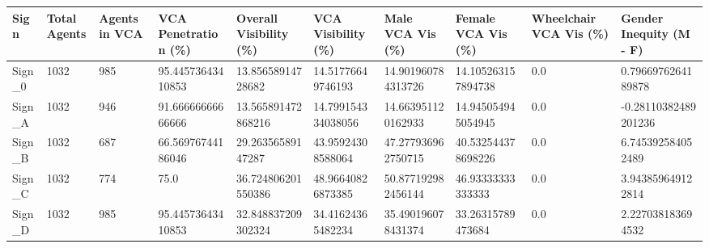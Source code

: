 \begin{tabular}{llllllllll}
\hline
Sign & Total Agents & Agents in VCA & VCA Penetration (\%) & Overall Visibility (\%) & VCA Visibility (\%) & Male VCA Vis (\%) & Female VCA Vis (\%) & Wheelchair VCA Vis (\%) & Gender Inequity (M - F) \\ \hline
Sign\_0 & 1032 & 985 & 95.44573643410853 & 13.85658914728682 & 14.51776649746193 & 14.901960784313726 & 14.105263157894738 & 0.0 & 0.7966976264189878 \\
Sign\_A & 1032 & 946 & 91.66666666666666 & 13.565891472868216 & 14.799154334038056 & 14.663951120162933 & 14.945054945054945 & 0.0 & -0.28110382489201236 \\
Sign\_B & 1032 & 687 & 66.56976744186046 & 29.26356589147287 & 43.95924308588064 & 47.277936962750715 & 40.532544378698226 & 0.0 & 6.745392584052489 \\
Sign\_C & 1032 & 774 & 75.0 & 36.724806201550386 & 48.96640826873385 & 50.877192982456144 & 46.93333333333333 & 0.0 & 3.943859649122814 \\
Sign\_D & 1032 & 985 & 95.44573643410853 & 32.848837209302324 & 34.41624365482234 & 35.490196078431374 & 33.26315789473684 & 0.0 & 2.227038183694532 \\
\hline
\end{tabular}
